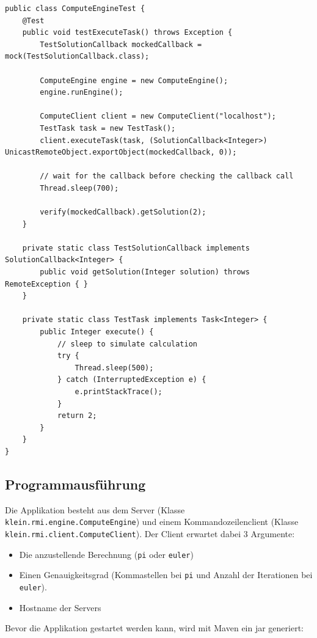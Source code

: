 \begin{lstlisting}[style=Java, caption=Testfall zur Durchf\"uhrung von asynchronen Berechnungen]
public class ComputeEngineTest {
    @Test
    public void testExecuteTask() throws Exception {
        TestSolutionCallback mockedCallback = mock(TestSolutionCallback.class);

        ComputeEngine engine = new ComputeEngine();
        engine.runEngine();

        ComputeClient client = new ComputeClient("localhost");
        TestTask task = new TestTask();
        client.executeTask(task, (SolutionCallback<Integer>) UnicastRemoteObject.exportObject(mockedCallback, 0));

        // wait for the callback before checking the callback call
        Thread.sleep(700);

        verify(mockedCallback).getSolution(2);
    }

    private static class TestSolutionCallback implements SolutionCallback<Integer> {
        public void getSolution(Integer solution) throws RemoteException { }
    }

    private static class TestTask implements Task<Integer> {
        public Integer execute() {
            // sleep to simulate calculation
            try {
                Thread.sleep(500);
            } catch (InterruptedException e) {
                e.printStackTrace();
            }
            return 2;
        }
    }
}
\end{lstlisting}

\subsection{Programmausf\"uhrung}
Die Applikation besteht aus dem Server (Klasse \texttt{klein.rmi.engine.ComputeEngine}) und einem Kommandozeilenclient (Klasse \texttt{klein.rmi.client.ComputeClient}).
Der Client erwartet dabei 3 Argumente:
\begin{itemize}
    \item Die anzustellende Berechnung (\texttt{pi} oder \texttt{euler})
    \item Einen Genauigkeitsgrad (Kommastellen bei \texttt{pi} und Anzahl der Iterationen bei \texttt{euler}).
    \item Hostname der Servers
\end{itemize}

Bevor die Applikation gestartet werden kann, wird mit Maven ein jar generiert:

